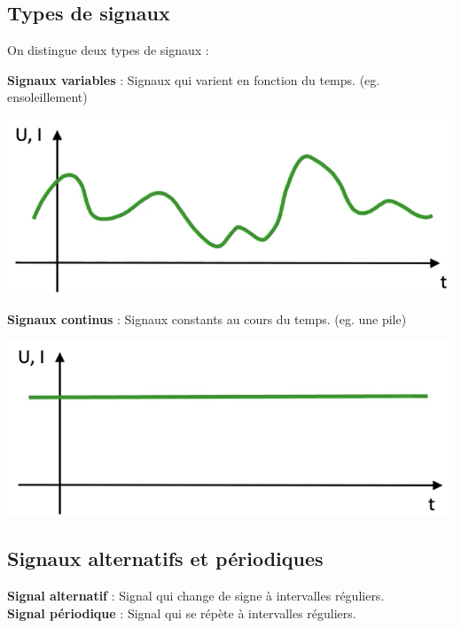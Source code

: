 \subsection{Types de signaux}
On distingue deux types de signaux : \\
\vspace{10px}
\begin{minipage}[htp]{0.45\textwidth}
    \textbf{Signaux variables} : Signaux qui varient en fonction du temps. (eg. ensoleillement) \\
    \begin{center}
        \includegraphics[width=\textwidth]{chapters/chapter1/images/variable.png}
    \end{center}
\end{minipage}
\hfill
\vline
\hfill
\begin{minipage}[htp]{0.45\textwidth}
\textbf{Signaux continus} : Signaux constants au cours du temps. (eg. une pile) \\
\begin{center}
    \includegraphics[width=\textwidth]{chapters/chapter1/images/continu.png}
\end{center}
\end{minipage}
\newpage
\subsection{Signaux alternatifs et périodiques}
\textbf{Signal alternatif} : Signal qui change de signe à intervalles réguliers. \\ 
\textbf{Signal périodique} : Signal qui se répète à intervalles réguliers. \\

